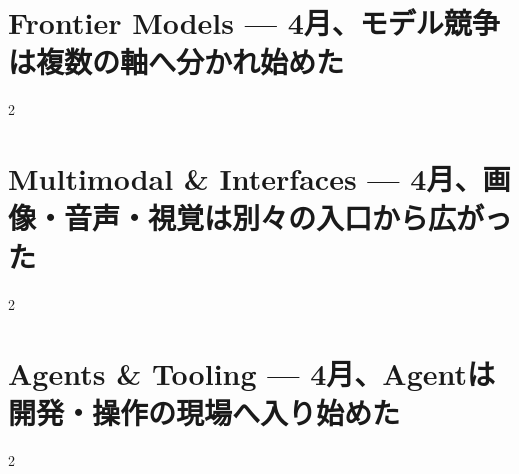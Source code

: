\documentclass[lualatex,a4paper,11pt]{jlreq}
\begin{document}
\surveycover
\clearpage


\clearpage
\section{Frontier Models — 4月、モデル競争は複数の軸へ分かれ始めた}
\label{pkg:frontier-models-april}
\vspace{0.15em}

\vspace{0.2em}
\begin{multicols}{2}

\end{multicols}

\medskip


\Needspace{0.45\textheight}
\bigskip
\section{Multimodal \& Interfaces — 4月、画像・音声・視覚は別々の入口から広がった}
\label{pkg:multimodal-interfaces-april}
\vspace{0.15em}

\vspace{0.2em}
\begin{multicols}{2}

\end{multicols}

\medskip


\Needspace{0.45\textheight}
\bigskip
\section{Agents \& Tooling — 4月、Agentは開発・操作の現場へ入り始めた}
\label{pkg:agents-tooling-april}
\vspace{0.15em}

\vspace{0.2em}
\begin{multicols}{2}

\end{multicols}

\medskip


\Needspace{0.45\textheight}
\bigskip
\end{document}
